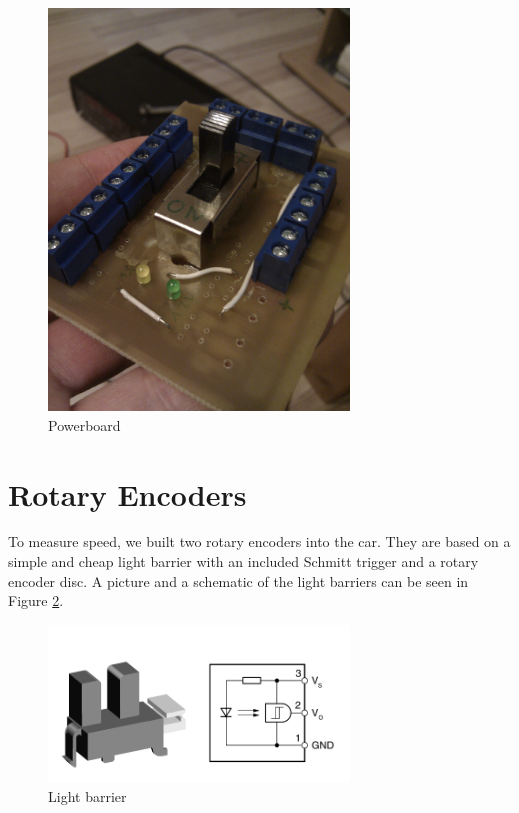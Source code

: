 \documentclass[a4paper
               ,10pt
               ,DIV=10 %
               ,BCOR=0.3cm
               ,pagesize %
               ,headings=small
               ,bibtotoc
               ]
               {scrartcl}
\begin{document}
\begin{figure}[H]
\begin{center}
\includegraphics[width=8cm]{pic/powerboardr.jpg}
\caption{Powerboard}
\label{figpowerboardr}
\end{center}
\end{figure}


\section{Rotary Encoders} %

To measure speed, we built two rotary encoders into the car.
They are based on a simple and cheap light barrier with an included Schmitt trigger and a rotary encoder disc.
A picture and a schematic of the light barriers can be seen in Figure \ref{figls}.
\begin{figure}[H]
\begin{center}
\includegraphics[width=8cm]{pic/ls.png}
\caption{Light barrier}
\label{figls}
\end{center}
\end{figure}
\end{document}
